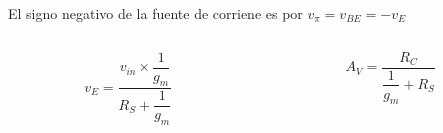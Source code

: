 \begin{frame}[t]
\begin{columns}
\begin{column}{0.6\textwidth}
            El signo negativo de la fuente de corriene es por $v_\pi = v_{BE} = -v_{E}$

            \begin{columns}
                \begin{column}{0.5\textwidth}
                    \[ v_E = \dfrac{v_{in} \times \dfrac{1}{g_m}}{R_S + \dfrac{1}{g_m}} \]
                \end{column}
                \begin{column}{0.5\textwidth}
                    \[ \boxed{A_V = \dfrac{R_C}{\dfrac{1}{g_m} + R_S}} \]
                \end{column}
            \end{columns}
        \end{column}
    \end{columns}
\end{frame}

